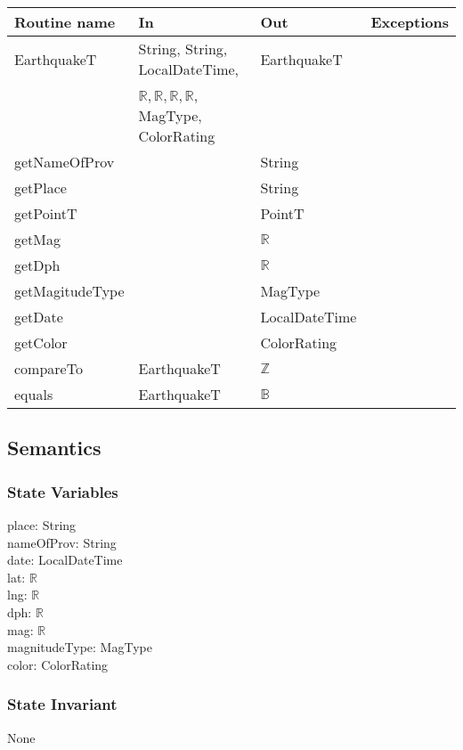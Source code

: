 \documentclass[12pt]{article}
\begin{document}
\begin{tabular}{| l | l | l | l |}
\hline
\textbf{Routine name} & \textbf{In} & \textbf{Out} & \textbf{Exceptions}\\
\hline
EarthquakeT & String, String, LocalDateTime, & EarthquakeT &\\
\hhline{|~|~|~|}
~ &$\mathbb{R}, \mathbb{R}, \mathbb{R}, \mathbb{R}$, MagType, ColorRating & ~ &\\
\hline
getNameOfProv & ~ & String & \\
\hline
getPlace & ~ & String & \\
\hline
getPointT & ~ & PointT & \\
\hline
getMag & ~ & $\mathbb{R}$ & \\
\hline
getDph & ~ & $\mathbb{R}$ & \\
\hline
getMagitudeType & ~ & MagType & \\
\hline
getDate & ~ & LocalDateTime & \\
\hline
getColor & ~ & ColorRating & \\
\hline
compareTo & EarthquakeT & $\mathbb{Z}$ & \\
\hline
equals & EarthquakeT & $\mathbb{B}$ & \\
\hline
\end{tabular}

\subsection* {Semantics}

\subsubsection* {State Variables}

place: String\\ 
nameOfProv: String\\
date: LocalDateTime\\
lat: $\mathbb{R}$\\
lng: $\mathbb{R}$\\
dph: $\mathbb{R}$\\
mag: $\mathbb{R}$\\
magnitudeType: MagType\\
color: ColorRating

\subsubsection* {State Invariant}

None
\end{document}
